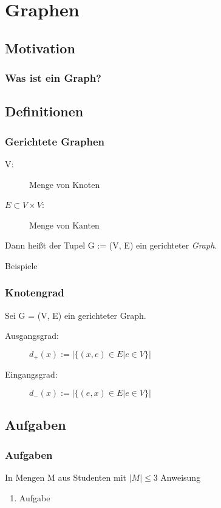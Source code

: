 
\section{Graphen}
\subsection{Motivation}
\begin{frame}[fragile]
  \frametitle{Was ist ein Graph?}
\end{frame}

\subsection{Definitionen}
\begin{frame}[fragile]
  \frametitle{Gerichtete Graphen}
  \begin{definition}
    \begin{description}
      \item[V:] Menge von Knoten
      \item[$E \subset V \times V$:] Menge von Kanten
    \end{description}
    Dann heißt der Tupel G := (V, E) ein gerichteter \emph{Graph}.
  \end{definition}\pause
  \begin{exampleblock}{Beispiele}
  \end{exampleblock}
\end{frame}
\begin{frame}
  \frametitle{Knotengrad}
  \begin{definition}
    Sei G = (V, E) ein gerichteter Graph.
    \begin{description}
      \item[Ausgangsgrad:] $d_+(x) := |\{(x, e) \in E | e \in V\}|$
      \item[Eingangsgrad:] $d_-(x) := |\{(e, x) \in E | e \in V\}|$
    \end{description}
  \end{definition}\pause
\end{frame}

\subsection{Aufgaben}
\begin{frame}
  \frametitle{Aufgaben}
  \begin{exampleblock}{In Mengen M aus Studenten mit $|M| \leq 3$}
      Anweisung
      \begin{enumerate}
        \item Aufgabe
      \end{enumerate}
  \end{exampleblock}
\end{frame}
